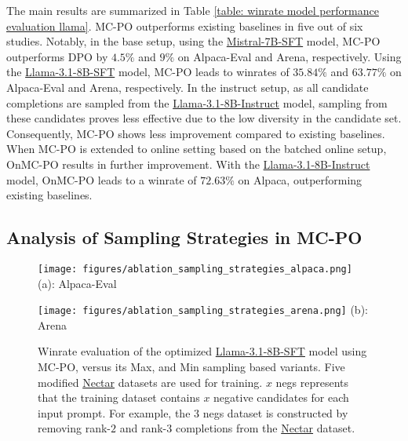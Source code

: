The main results are summarized in Table \ref{table: winrate model performance evaluation llama}. 
MC-PO outperforms existing baselines in five out of six studies. 
Notably, in the base setup, using the {\href{https://huggingface.co/HuggingFaceH4/mistral-7b-sft-beta}{Mistral-7B-SFT}} model, 
MC-PO outperforms DPO by 
$4.5\%$ and $9\%$ on Alpaca-Eval and Arena, respectively. 
Using the {\href{https://huggingface.co/allenai/Llama-3.1-Tulu-3-8B-SFT}{Llama-3.1-8B-SFT}} model, MC-PO leads to winrates of $35.84\%$ and $63.77\%$ on Alpaca-Eval and Arena, respectively. 
In the instruct setup, as all candidate completions are sampled from the {\href{https://huggingface.co/meta-llama/Llama-3.1-8B-Instruct}{Llama-3.1-8B-Instruct}} model, sampling from these candidates proves less effective due to the low diversity in the candidate set. 
Consequently, MC-PO shows less improvement compared to existing baselines.
When MC-PO is extended to online setting based on the batched online setup,
OnMC-PO results in further improvement.
With the {\href{https://huggingface.co/meta-llama/Llama-3.1-8B-Instruct}{Llama-3.1-8B-Instruct}} model,
OnMC-PO leads to a winrate of $72.63 \%$ on Alpaca, outperforming existing baselines.





\subsection{Analysis of Sampling Strategies in MC-PO}
\label{sec: experiments on sampling strategies}
\begin{figure}[th]
\centering
\begin{minipage}{.99\columnwidth}
\centering
    \texttt{[image: figures/ablation\_sampling\_strategies\_alpaca.png]}
    (a): Alpaca-Eval
\end{minipage}
\begin{minipage}{.99\columnwidth}
\centering
    \texttt{[image: figures/ablation\_sampling\_strategies\_arena.png]}
    (b): Arena
\end{minipage}
\caption{
Winrate evaluation of the optimized \href{https://huggingface.co/allenai/Llama-3.1-Tulu-3-8B-SFT}{Llama-3.1-8B-SFT} model using MC-PO, versus its Max, and Min sampling based variants. 
Five modified \href{https://huggingface.co/datasets/berkeley-nest/Nectar}{Nectar} datasets are used for training. 
$x$ negs represents that the training dataset contains $x$ negative candidates for each input prompt. 
For example, the $3$ negs dataset is constructed by removing rank-$2$ and rank-$3$ completions from the \href{https://huggingface.co/datasets/berkeley-nest/Nectar}{Nectar} dataset.
}
\label{fig: ablation sampling strategies}
\end{figure}



